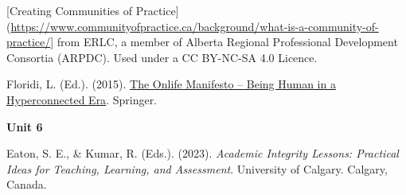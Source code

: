 \documentclass[
]{book}
\theoremstyle{definition}
\theoremstyle{definition}
\theoremstyle{definition}
\theoremstyle{definition}
\theoremstyle{remark}
\begin{document}
{[}Creating Communities of Practice{]}(\url{https://www.communityofpractice.ca/background/what-is-a-community-of-practice/}{]} from ERLC, a member of Alberta Regional Professional Development Consortia (ARPDC). Used under a CC BY-NC-SA 4.0 Licence.

Floridi, L. (Ed.). (2015). \href{https://link.springer.com/book/10.1007/978-3-319-04093-6}{The Onlife Manifesto -- Being Human in a Hyperconnected Era}. Springer.

\textbf{Unit 6}

Eaton, S. E., \& Kumar, R. (Eds.). (2023). \emph{Academic Integrity Lessons: Practical Ideas for Teaching, Learning, and Assessment}. University of Calgary. Calgary, Canada.

  
\end{document}
